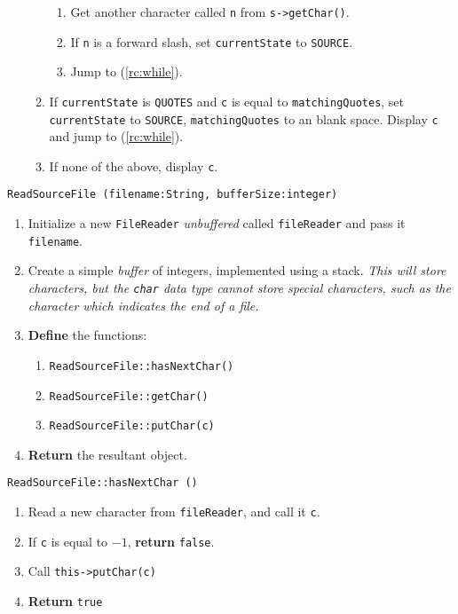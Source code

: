 \begin{enumerate}
\begin{enumerate}
		\begin{enumerate}
			\item Get another character called \texttt{n} from \texttt{s->getChar()}.
			\item If \texttt{n} is a forward slash, set \texttt{currentState} to \texttt{SOURCE}.
			\item Jump to (\ref{rc:while}).
		\end{enumerate}
		\item If \texttt{currentState} is \texttt{QUOTES} and \texttt{c} is equal to \texttt{matchingQuotes}, set \texttt{currentState}
			to \texttt{SOURCE}, \texttt{matchingQuotes} to an blank space. Display \texttt{c} and jump to (\ref{rc:while}).
		\item If none of the above, display \texttt{c}.
	\end{enumerate}
\end{enumerate}
\vspace{8mm}
\texttt{ReadSourceFile (filename:String, bufferSize:integer)}
\begin{enumerate}
	\item Initialize a new \texttt{FileReader} \textit{unbuffered} called \texttt{fileReader} and pass it \texttt{filename}.
	\item Create a simple \textit{buffer} of integers, implemented using a stack.
		\textit{This will store characters, but the \texttt{char} data type cannot store special characters, such as the character
			which indicates the end of a file.}
	\item \textbf{Define} the functions:
	\begin{enumerate}
		\item \texttt{ReadSourceFile::hasNextChar()}
		\item \texttt{ReadSourceFile::getChar()}
		\item \texttt{ReadSourceFile::putChar(c)}
	\end{enumerate}
	\item \textbf{Return} the resultant object.
\end{enumerate}
\vspace{5mm}
\texttt{ReadSourceFile::hasNextChar ()} 
\begin{enumerate}
	\item Read a new character from \texttt{fileReader}, and call it \texttt{c}.
	\item If \texttt{c} is equal to $-1$, \textbf{return} \texttt{false}.
	\item Call \texttt{this->putChar(c)}
	\item \textbf{Return} \texttt{true}
\end{enumerate}
